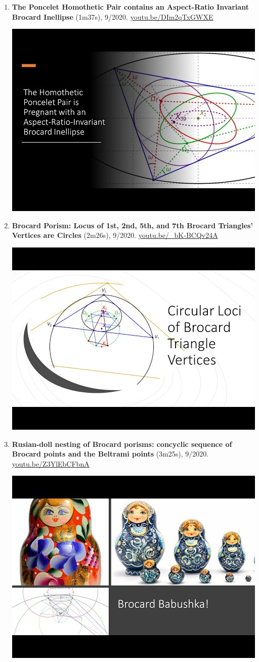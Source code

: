 \documentclass[12pt]{article}
\begin{document}
\begin{enumerate}[resume]
% 
\item \textbf{The Poncelet Homothetic Pair contains an Aspect-Ratio Invariant Brocard Inellipse} (1m37s), 9/2020. \href{https://youtu.be/DIm2qTxGWXE}{\url{youtu.be/DIm2qTxGWXE}}
\begin{center}\includegraphics[width=.5\textwidth]{pics/DIm2qTxGWXE.jpg}\end{center}
% 
\item \textbf{Brocard Porism: Locus of 1st, 2nd, 5th, and 7th Brocard Triangles' Vertices are Circles} (2m26s), 9/2020. \href{https://youtu.be/_bK-BCQv24A}{\url{youtu.be/\_bK-BCQv24A}}
\begin{center}\includegraphics[width=.5\textwidth]{pics/_bK-BCQv24A.jpg}\end{center}
% 
\item \textbf{Rusian-doll nesting of Brocard porisms: concyclic sequence of Brocard points and the Beltrami points} (3m25s), 9/2020. \href{https://youtu.be/Z3YlEbCFbnA}{\url{youtu.be/Z3YlEbCFbnA}}
\begin{center}\includegraphics[width=.5\textwidth]{pics/Z3YlEbCFbnA.jpg}\end{center}

\end{enumerate}
\end{document}
